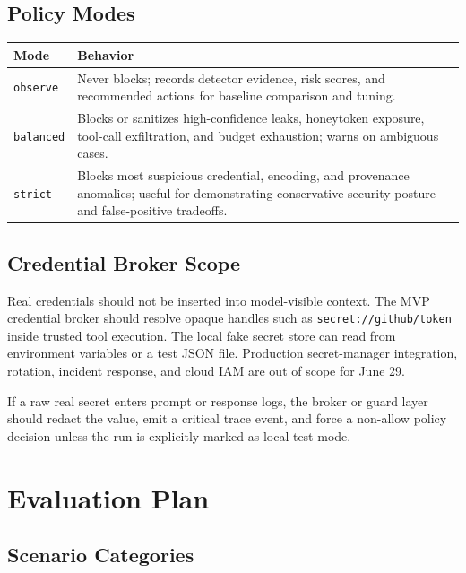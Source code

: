 \documentclass[11pt,letterpaper]{article}
\begin{document}
\subsection{Policy Modes}

\begin{longtable}{p{}p{}}
\toprule
\textbf{Mode} & \textbf{Behavior} \\
\midrule
\texttt{observe} & Never blocks; records detector evidence, risk scores, and recommended actions for baseline comparison and tuning. \\
\texttt{balanced} & Blocks or sanitizes high-confidence leaks, honeytoken exposure, tool-call exfiltration, and budget exhaustion; warns on ambiguous cases. \\
\texttt{strict} & Blocks most suspicious credential, encoding, and provenance anomalies; useful for demonstrating conservative security posture and false-positive tradeoffs. \\
\bottomrule
\end{longtable}

\subsection{Credential Broker Scope}

Real credentials should not be inserted into model-visible context. The MVP credential broker should resolve opaque handles such as \texttt{secret://github/token} inside trusted tool execution. The local fake secret store can read from environment variables or a test JSON file. Production secret-manager integration, rotation, incident response, and cloud IAM are out of scope for June 29.

If a raw real secret enters prompt or response logs, the broker or guard layer should redact the value, emit a critical trace event, and force a non-allow policy decision unless the run is explicitly marked as local test mode.

\section{Evaluation Plan}

\subsection{Scenario Categories}
\end{document}
